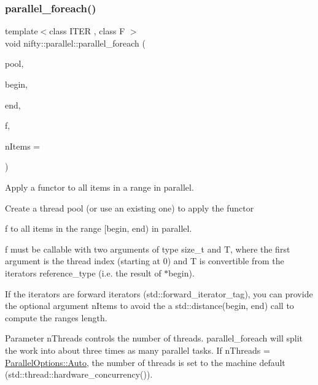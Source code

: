 \subsubsection{\texorpdfstring{parallel\+\_\+foreach()}{parallel\_foreach()}\hspace{0.1cm}{\footnotesize\ttfamily [1/4]}}
{\footnotesize\ttfamily template$<$class I\+T\+ER , class F $>$ \\
void nifty\+::parallel\+::parallel\+\_\+foreach (\begin{DoxyParamCaption}\item[{\hyperlink{classnifty_1_1parallel_1_1ThreadPool}{Thread\+Pool} \&}]{pool,  }\item[{I\+T\+ER}]{begin,  }\item[{I\+T\+ER}]{end,  }\item[{F \&\&}]{f,  }\item[{const std\+::ptrdiff\+\_\+t}]{n\+Items = {} }\end{DoxyParamCaption})\hspace{0.3cm}{\ttfamily [inline]}}



Apply a functor to all items in a range in parallel. 

Create a thread pool (or use an existing one) to apply the functor \begin{DoxyItemize}
\item f to all items in the range {\ttfamily \mbox{[}begin, end)} in parallel. \item f must be callable with two arguments of type {\ttfamily size\+\_\+t} and {\ttfamily T}, where the first argument is the thread index (starting at 0) and T is convertible from the iterator\textquotesingle{}s {\ttfamily reference\+\_\+type} (i.\+e. the result of {\ttfamily $\ast$begin}).\end{DoxyItemize}
If the iterators are forward iterators ({\ttfamily std\+::forward\+\_\+iterator\+\_\+tag}), you can provide the optional argument {\ttfamily n\+Items} to avoid the a {\ttfamily std\+::distance(begin, end)} call to compute the range\textquotesingle{}s length.

Parameter {\ttfamily n\+Threads} controls the number of threads. {\ttfamily parallel\+\_\+foreach} will split the work into about three times as many parallel tasks. If {\ttfamily n\+Threads = \hyperlink{classnifty_1_1parallel_1_1ParallelOptions_a7a945e8bd698883de4af0f906b2aa88aa0bd8f9fd00d78fcfdcb6ee1575f43fd6}{Parallel\+Options\+::\+Auto}}, the number of threads is set to the machine default ({\ttfamily std\+::thread\+::hardware\+\_\+concurrency()}).

